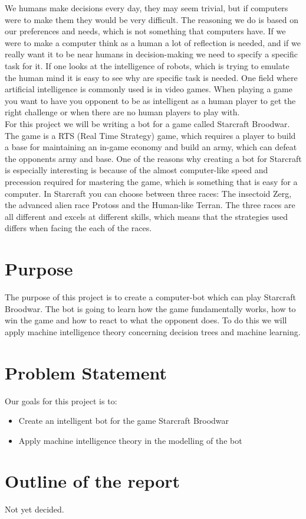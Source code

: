 	We humans make decisions every day, they may seem trivial, but if computers were to make them they would be very difficult. The reasoning we do 
	is based on our preferences and needs, which is not something that computers have. 
	If we were to make a computer think as a human a lot of reflection is needed, and if we really want it to be near humans in decision-making we need 
	to specify a specific task for it. If one looks at the intelligence of robots, which is trying to emulate the human mind 
	it is easy to see why are specific task is needed. One field where artificial intelligence is commonly used is in video games. When playing 
	a game you want to have you opponent to be as intelligent as a human player to get the right challenge or when there are no 
	human players to play with. \\
	
	For this project we will be writing a bot for a game called Starcraft Broodwar. The game is a RTS (Real Time 
	Strategy) game, which requires a player to build a base for maintaining an in-game economy and build an army, 
	which can defeat the opponents army and base. One of the reasons why creating a bot for Starcraft is 
	especially interesting is because of the almost computer-like speed and precession required for mastering the game, 
	which is something that is easy for a computer. 
	In Starcraft you can choose between three races: The insectoid Zerg, the advanced alien race Protoss and the Human-like Terran. 
	The three races are all different and excels at different skills, which means that the strategies used differs when 
	facing the each of the races. 


\section{Purpose}
	The purpose of this project is to create a computer-bot which can play Starcraft Broodwar. 
	The bot is going to learn how the game fundamentally works, 
	how to win the game and how to react to what the opponent does. 
	To do this we will apply machine intelligence theory concerning decision trees and machine learning.


\section{Problem Statement}
	Our goals for this project is to:
	\begin{itemize}
		\item Create an intelligent bot for the game Starcraft Broodwar
		\item Apply machine intelligence theory in the modelling of the bot
	\end{itemize}


\section{Outline of the report}
	Not yet decided.